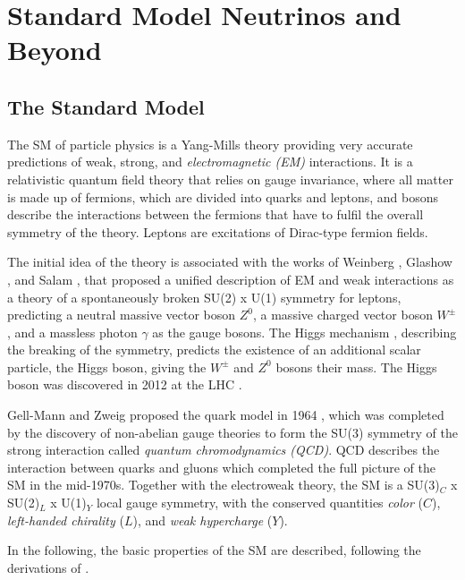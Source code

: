 \setchapterpreamble[u]{\margintoc}

\chapter{Standard Model Neutrinos and Beyond}


\section{The Standard Model}

The SM of particle physics is a Yang-Mills theory  providing very accurate predictions of weak, strong, and \textit{electromagnetic (EM)} interactions. It is a relativistic quantum field theory that relies on gauge invariance, where all matter is made up of fermions, which are divided into quarks and leptons, and bosons describe the interactions between the fermions that have to fulfil the overall symmetry of the theory. Leptons are excitations of Dirac-type fermion fields.

The initial idea of the theory is associated with the works of Weinberg , Glashow , and Salam \cite{Salam}, that proposed a unified description of EM and weak interactions as a theory of a spontaneously broken SU(2) x U(1) symmetry for leptons, predicting a neutral massive vector boson $Z^0$, a massive charged vector boson $W^\pm$, and a massless photon $\gamma$ as the gauge bosons. The Higgs mechanism , describing the breaking of the symmetry, predicts the existence of an additional scalar particle, the Higgs boson, giving the $W^\pm$ and $Z^0$ bosons their mass. The Higgs boson was discovered in 2012 at the LHC .

Gell-Mann and Zweig proposed the quark model in 1964 , which was completed by the discovery of non-abelian gauge theories \cite{non_abel_gauge} to form the SU(3) symmetry of the strong interaction called \textit{quantum chromodynamics (QCD)}. QCD describes the interaction between quarks and gluons which completed the full picture of the SM in the mid-1970s. Together with the electroweak theory, the SM is a SU(3)$_C$ x SU(2)$_L$ x U(1)$_Y$ local gauge symmetry, with the conserved quantities \textit{color} ($C$), \textit{left-handed chirality} ($L$), and \textit{weak hypercharge} ($Y$).

In the following, the basic properties of the SM are described, following the derivations of .


